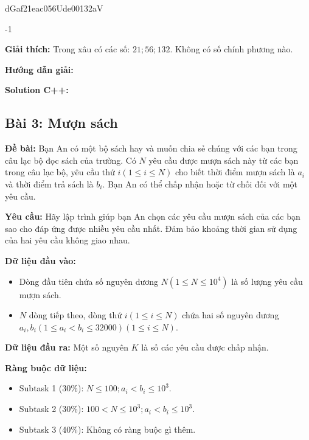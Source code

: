 \documentclass[12pt]{scrartcl}  %
\begin{document}
\begin{tcolorbox}[colback=gray!5!white, colframe=blue!50!black, title=Input]
dGaf21eac056Ude00132aV
\end{tcolorbox}

\begin{tcolorbox}[colback=gray!5!white, colframe=green!50!black, title=Output]
-1
\end{tcolorbox}

\textbf{Giải thích:}
Trong xâu có các số: $21; 56; 132$. Không có số chính phương nào.

\textbf{Hướng dẫn giải:}

\textbf{Solution C++:}

\subsection{Bài 3: Mượn sách}
\textbf{Đề bài:}
Bạn An có một bộ sách hay và muốn chia sẻ chúng với các bạn trong câu lạc bộ đọc sách 
của trường. Có $N$ yêu cầu được mượn sách này từ các bạn trong câu lạc bộ, yêu cầu thứ $i (1 \le i \le N)$ cho biết thời điểm 
mượn sách là $a_i$ và thời điểm trả sách là $b_i$. Bạn An có thể chấp nhận hoặc từ chối đối với một yêu cầu. 

\textbf{Yêu cầu:}
Hãy lập trình giúp bạn An chọn các yêu cầu mượn sách của các bạn sao cho đáp ứng được nhiều yêu cầu nhất. Đảm bảo khoảng thời gian sử dụng của hai yêu cầu không giao nhau.

\textbf{Dữ liệu đầu vào:}
\begin{itemize}
    \item Dòng đầu tiên chứa số nguyên dương $N (1 \leq N \leq 10^4)$ là số lượng yêu cầu mượn sách.
    \item $N$ dòng tiếp theo, dòng thứ $i (1 \leq i \leq N)$ chứa hai số nguyên dương $a_i, b_i (1 \leq a_i < b_i \leq 32000) (1 \leq i \leq N)$. 
\end{itemize}

\textbf{Dữ liệu đầu ra:}
Một số nguyên $K$ là số các yêu cầu được chấp nhận. 

\textbf{Ràng buộc dữ liệu:}
\begin{itemize}
    \item Subtask 1 (30\%): $N \leq 100; a_i < b_i \le 10^3$.
    \item Subtask 2 (30\%): $100 < N \leq 10^3; a_i < b_i \leq 10^3$.
    \item Subtask 3 (40\%): Không có ràng buộc gì thêm.
\end{itemize}
\end{document}
